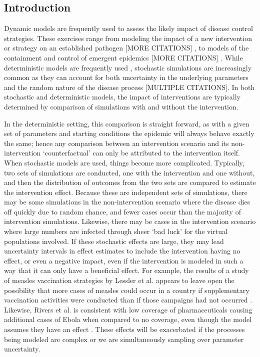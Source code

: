 \documentclass[PTRSB]{rsos}
\begin{document}
\begin{multicols}{2}
\section{Introduction}
Dynamic models are frequently used to assess the likely impact of disease control strategies.
These exercises range from modeling the impact of a new intervention or strategy on an established pathogen [MORE CITATIONS] \cite{ferguson-et-al:2005,azman-et-al:2016}, to models of the containment and control of emergent epidemics [MORE CITATIONS] \cite{lessler-et-al:2016}.
While deterministic models are frequently used \cite{meltzer-et-al:2014,dodd-et-all:2010,fraser-et-al:2004}, stochastic simulations are increasingly common as they can account for both uncertainty in the underlying parameters and the random nature of the disease process [MULTIPLE CITATIONS]\cite{ferguson-et-al:2003}.
In both stochastic and deterministic models, the impact of interventions are typically determined by comparison of simulations with and without the intervention.

In the deterministic setting, this comparison is straight forward, as with a given set of parameters and starting conditions the epidemic will always behave exactly the same; hence any comparison between an intervention scenario and its non-intervention `counterfactual' can only be attributed to the intervention itself.
When stochastic models are used, things become more complicated.
Typically, two sets of simulations are conducted, one with the intervention and one without, and then the distribution of outcomes from the two sets are compared to estimate the intervention effect.
Because these are independent sets of simulations, there may be some simulations in the non-intervention scenario where the disease dies off quickly due to random chance, and fewer cases occur than the majority of intervention simulations.
Likewise, there may be cases in the intervention scenario where large numbers are infected through sheer `bad luck' for the virtual populations involved.
If these stochastic effects are large, they may lead uncertainty intervals in effect estimates to include the intervention having no effect, or even a negative impact, even if the intervention is modeled in such a way that it can only have a beneficial effect.
For example, the results of a study of measles vaccination strategies by Lessler et al.
appears to leave open the possibility that more cases of measles could occur in a country if supplementary vaccination activities were conducted than if those campaigns had not occurred \cite{lessler-et-al:2016}.
Likewise, Rivers et al. is consistent with low coverage of pharmaceuticals causing additional cases of Ebola when compared to no coverage, even though the model assumes they have an effect \cite{rivers-et-al:2014}.
These effects will be exacerbated if the processes being modeled are complex or we are simultaneously sampling over parameter uncertainty.


\end{multicols}
\end{document}
